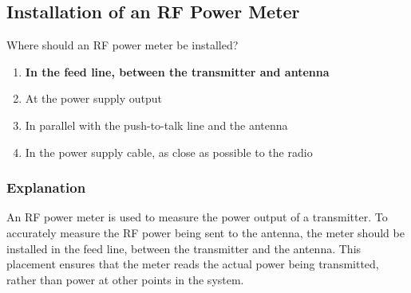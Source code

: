 \subsection{Installation of an RF Power Meter}
\label{T4A05}

\begin{tcolorbox}[colback=gray!10!white,colframe=black!75!black,title=T4A05]
Where should an RF power meter be installed?
\begin{enumerate}[noitemsep]
    \item \textbf{In the feed line, between the transmitter and antenna}
    \item At the power supply output
    \item In parallel with the push-to-talk line and the antenna
    \item In the power supply cable, as close as possible to the radio
\end{enumerate}
\end{tcolorbox}

\subsubsection*{Explanation}
An RF power meter is used to measure the power output of a transmitter. To accurately measure the RF power being sent to the antenna, the meter should be installed in the feed line, between the transmitter and the antenna. This placement ensures that the meter reads the actual power being transmitted, rather than power at other points in the system.